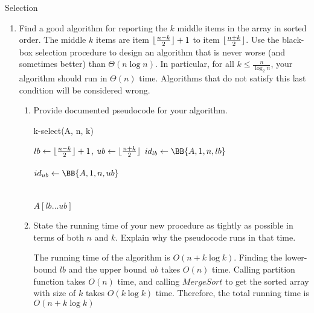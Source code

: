 \documentclass{article}
\begin{document}
\begin{section}{Selection}
\begin{enumerate}
    \item Find a good algorithm for reporting the $k$ middle items in the array in sorted order. The middle $k$ items are item $\lfloor\frac{n-k}{2}\rfloor + 1$ to item $\lfloor\frac{n+k}{2}\rfloor$. Use the black-box selection procedure to design an algorithm that is never worse (and sometimes better) than $\Theta (n \log n)$. In particular, for all $k \leq \frac{n}{\log_2 n}$, your algorithm should run in $\Theta(n)$ time. Algorithms that do not satisfy this last condition will be considered wrong.
    
    \begin{enumerate}
        \item Provide documented pseudocode for your algorithm.
        
        \begin{minipage}{\linewidth}
        \begin{algorithm}[H]
        \caption{k-select(A, n, k)}
            $lb \gets \lfloor\frac{n-k}{2}\rfloor + 1$, $ub \gets \lfloor\frac{n+k}{2}\rfloor$  
            $id_{lb} \gets \BB{A, 1, n, lb}$ 
            \\
             \\
            $id_{ub} \gets \BB{A, 1, n, ub}$ 
             \\
            \\
            
            \\
            \KwRet $A[lb \dots ub]$
        \end{algorithm}
        \end{minipage}
        
        \item  State the running time of your new procedure as tightly as possible in terms of both $n$ and $k$. Explain why the pseudocode runs in that time.
        
        The running time of the algorithm is $O(n + k \log k)$. Finding the lower-bound $lb$ and the upper bound $ub$ takes $O(n)$ time. 
        Calling partition function takes $O(n)$ time, and calling $MergeSort$ to get the sorted array with size of $k$ takes $O(k \log k)$ time.
        Therefore, the total running time is $O(n + k \log k)$
    \end{enumerate}
    

\end{enumerate}
\end{section}
\end{document}
